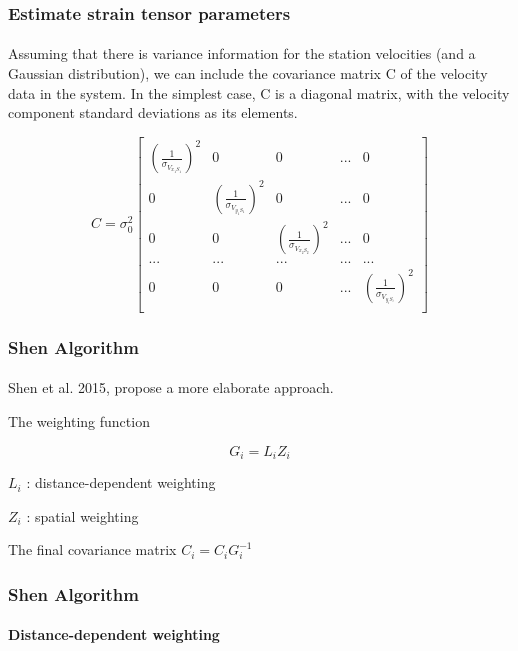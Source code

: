 \begin{frame}
 \frametitle{Estimate strain tensor parameters}
 \framesubtitle{}
 \label{ch2:}
 
 Assuming that there is variance information for the station velocities (and a Gaussian distribution), we can include the covariance matrix C  of the velocity data in the system. In the simplest case, C is a diagonal matrix, with the velocity component standard deviations as its elements.
 
 \[
 C = \sigma_{0}^{2} 
 \begin{bmatrix}
 (\frac{1}{\sigma_{V_{x_{1}S_{1}}}})^{2} & 0 & 0  & ... & 0\\
 0 & (\frac{1}{\sigma_{V_{y_{1}S_{1}}}})^{2} & 0  & ... & 0\\
 0 & 0 & ({\frac{1}{\sigma_{V_{x_{2}S_{2}}}}})^{2} & ... & 0\\
 ... &  ... & ... & ... & ...\\
 0 & 0 & 0 & ... & (\frac{1}{\sigma_{V_{y_{i}S_{i}}}})^{2}\\
 \end{bmatrix}
 \]

\end{frame}
\note{}


\begin{frame}
 \frametitle{Shen Algorithm}
 \framesubtitle{}
 \label{ch2:}
 
 Shen et al. 2015, propose a more elaborate approach.
 
 The weighting function
 
 \[ G_{i} = L_{i} Z_{i}  \]
 
 $ L_{i} $ : distance-dependent weighting
 
 $ Z_{i} $ : spatial weighting
 
 The final covariance matrix $ C_{i} = C_{i}G_{i}^{-1} $

\end{frame}
\note{}


\begin{frame}
 \frametitle{Shen Algorithm}
 \framesubtitle{Distance-dependent weighting}
 \label{ch2:}

\end{frame}
\note{}

